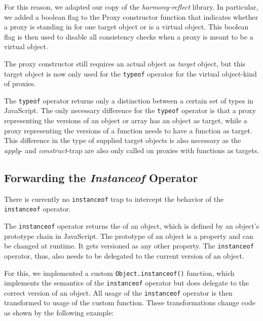 For this reason, we adapted our copy of the \emph{harmony-reflect} library.
In particular, we added a boolean flag to the Proxy constructor function that indicates whether a proxy is standing in for one target object or is a virtual object.
This boolean flag is then used to disable all consistency checks when a proxy is meant to be a virtual object.

The proxy constructor still requires an actual object as \emph{target} object, but this target object is now only used for the \lstinline{typeof} operator for the virtual object-kind of proxies.

The \lstinline{typeof} operator returns only a distinction between a certain set of types in JavaScript.
The only necessary difference for the \lstinline{typeof} operator is that a proxy representing the versions of an object or array has an object as target, while a proxy representing the versions of a function needs to have a function as target.
This difference in the type of supplied target objects is also necessary as the \emph{apply}- and \emph{construct}-trap are also only called on proxies with functions as targets.


\subsection{Forwarding the \emph{Instanceof} Operator}

There is currently no \lstinline{instanceof} trap to intercept the behavior of the \lstinline{instanceof} operator.

The \lstinline{instanceof} operator returns the of an object, which is defined by an object's prototype chain in JavaScript.
The prototype of an object is a property and can be changed at runtime.
It gets versioned as any other property.
The \lstinline{instanceof} operator, thus, also needs to be delegated to the current version of an object.

For this, we implemented a custom \lstinline{Object.instanceof()} function, which implements the semantics of the \lstinline{instanceof} operator but does delegate to the correct version of an object.
All usage of the \lstinline{instanceof} operator is then transformed to usage of the custom function.
These transformations change code as shown by the following example: 

